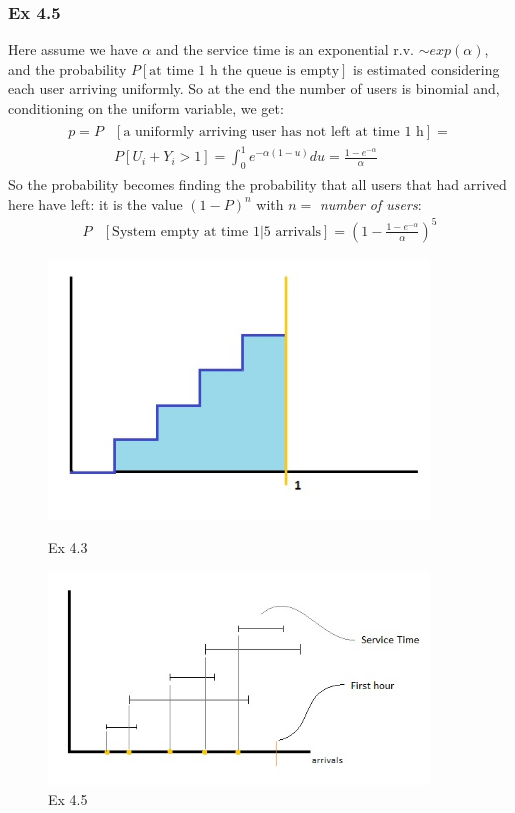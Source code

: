 \documentclass[a4paper, 12pt, openright]{book}
\theoremstyle{theoremdd}
\theoremstyle{remark}
\begin{document}
\subsubsection*{Ex 4.5}
Here assume we have $\alpha$  and the service time is an exponential r.v. $\sim exp(\alpha)$, and the probability $P[\text{at time 1 h the queue is empty}]$ is estimated considering each user arriving uniformly. So at the end the number of users is binomial and, conditioning on the uniform variable, we get:
\begin{align}
\begin{split}
p = P & [\text{a uniformly arriving user has not left at time 1 h}] =\\
& P[U_i + Y_i > 1] = \int_{0}^{1}e^{-\alpha(1-u)}du = \frac{1-e^{-\alpha}}{\alpha}
\end{split}
\end{align}
So the probability becomes finding the probability that all users that had arrived here have left: it is the value $(1-P)^{n}$ with $n = $ \textit{number of users}:
\begin{align}
P&[\text{System empty at time 1|5 arrivals}] = (1-\frac{1-e^{-\alpha}}{\alpha})^5
\end{align}
\begin{figure}[h]
\begin{minipage}[c]{0.5\textwidth}
\includegraphics[width = 0.9\textwidth]{Cri_area.jpg}
\caption{Ex 4.3}
\end{minipage}
\hspace{10mm}
\label{fig:area}
\begin{minipage}[c]{0.5\textwidth}
\includegraphics[width = 0.9\textwidth]{Cri_arrivals.jpg}
\caption{Ex 4.5}
\end{minipage}
\end{figure}
\end{document}
